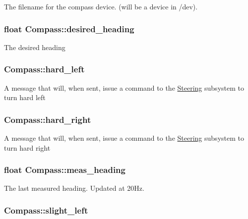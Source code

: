 The filename for the compass device. (will be a device in /dev). \hypertarget{classCompass_ac888a4dacdc477e53c99fe8e110966ae}{
\subsubsection[{desired\-\_\-heading}]{\setlength{\rightskip}{0pt plus 5cm}float Compass\-::desired\-\_\-heading\hspace{0.3cm}{\ttfamily [protected]}}}\label{classCompass_ac888a4dacdc477e53c99fe8e110966ae}
The desired heading \hypertarget{classCompass_a5cbc2cebdd91222c5ccf5bd28aa35ced}{
\subsubsection[{hard\-\_\-left}]{ Compass\-::hard\-\_\-left}}\label{classCompass_a5cbc2cebdd91222c5ccf5bd28aa35ced}
A message that will, when sent, issue a command to the \hyperlink{classSteering}{Steering} subsystem to turn hard left \hypertarget{classCompass_a15cd7eda15b824c8d5821a46667b861c}{
\subsubsection[{hard\-\_\-right}]{ Compass\-::hard\-\_\-right}}\label{classCompass_a15cd7eda15b824c8d5821a46667b861c}
A message that will, when sent, issue a command to the \hyperlink{classSteering}{Steering} subsystem to turn hard right \hypertarget{classCompass_af0f87a131e2c9833f7d52bed1a39bf75}{
\subsubsection[{meas\-\_\-heading}]{\setlength{\rightskip}{0pt plus 5cm}float Compass\-::meas\-\_\-heading\hspace{0.3cm}{\ttfamily [protected]}}}\label{classCompass_af0f87a131e2c9833f7d52bed1a39bf75}
The last measured heading. Updated at 20\-Hz. \hypertarget{classCompass_a9e0a282c1253451fd7967646074102ee}{
\subsubsection[{slight\-\_\-left}]{ Compass\-::slight\-\_\-left}}\label{classCompass_a9e0a282c1253451fd7967646074102ee}
